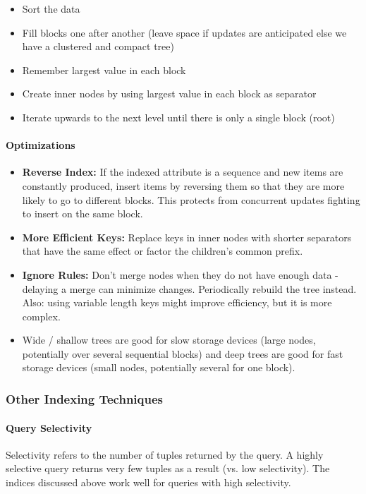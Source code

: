\begin{itemize}
    \item Sort the data
    \item Fill blocks one after another (leave space if updates are anticipated else we have a clustered and compact tree)
    \item Remember largest value in each block
    \item Create inner nodes by using largest value in each block as separator
    \item Iterate upwards to the next level until there is only a single block (root)
\end{itemize}

\paragraph{Optimizations}
\begin{itemize}
    \item \textbf{Reverse Index:} If the indexed attribute is a sequence and new items are constantly produced, insert items by reversing them so that they are more likely to go to different blocks. This protects from concurrent updates fighting to insert on the same block.
    \item \textbf{More Efficient Keys:} Replace keys in inner nodes with shorter separators that have the same effect or factor the children's common prefix. %
    \item \textbf{Ignore Rules:} Don't merge nodes when they do not have enough data - delaying a merge can minimize changes. Periodically rebuild the tree instead. Also: using variable length keys might improve efficiency, but it is more complex. %
    \item Wide / shallow trees are good for slow storage devices (large nodes, potentially over several sequential blocks) and deep trees are good for fast storage devices (small nodes, potentially several for one block).
\end{itemize}


\subsubsection{Other Indexing Techniques}

\paragraph{Query Selectivity}
Selectivity refers to the number of tuples returned by the query. A highly selective query returns very few tuples as a result (vs. low selectivity). The indices discussed above work well for queries with high selectivity.

